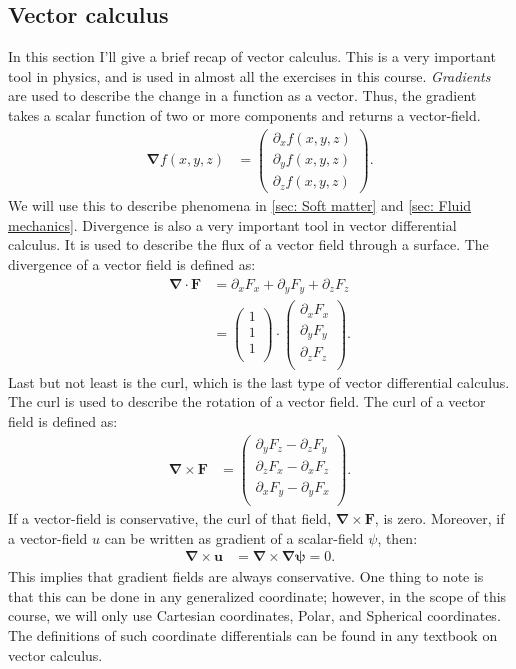 \documentclass[a4paper]{article}
\newcommand{\curl}[1]{\mathbf{\nabla}\times \mathbf{#1}}
\newcommand{\grad}{\mathbf{\nabla}}
\newcommand{\dive}[1]{\mathbf{\nabla}\cdot \mathbf{#1}}
\begin{document}
\subsection{Vector calculus}
In this section I'll give a brief recap of vector calculus. This is a very important tool in physics, and is used in almost all the exercises in this course.
\textit{Gradients} are used to describe the change in a function as a vector. Thus, the gradient takes a scalar function of two or more components and returns a vector-field.
\begin{align*}
    \grad f(x,y,z) &= \begin{pmatrix}\partial_x f(x,y,z)\\\partial_y f(x,y,z)\\\partial_z f(x,y,z)\end{pmatrix}.
\end{align*}We will use this to describe phenomena in \ref{sec: Soft matter} and \ref{sec: Fluid mechanics}. Divergence is also a very important tool in vector differential calculus.
It is used to describe the flux of a vector field through a surface. The divergence of a vector field is defined as:
\begin{align*}
    \dive{F} &= \partial_x F_x + \partial_y F_y + \partial_z F_z\\
    &= \begin{pmatrix}
        1\\
        1\\
        1\\
    \end{pmatrix}\cdot \begin{pmatrix}
        \partial_x F_x\\
        \partial_y F_y\\
        \partial_z F_z\\
    \end{pmatrix}.
\end{align*}Last but not least is the curl, which is the last type of vector differential calculus. The curl is used to describe the rotation of a vector field. The curl of a vector field is defined as:
\begin{align*}
    \curl{F} &= \begin{pmatrix}
        \partial_y F_z - \partial_z F_y\\
        \partial_z F_x - \partial_x F_z\\
        \partial_x F_y - \partial_y F_x\\
    \end{pmatrix}.
\end{align*}If a vector-field is conservative, the curl of that field, $\curl{F}$, is zero. Moreover, if a vector-field $u$ can be written as gradient of a scalar-field $\psi$, then:
\begin{align*}
    \curl{u} &= \curl{\grad \psi} = 0.
\end{align*}This implies that gradient fields are always conservative.
One thing to note is that this can be done in any generalized coordinate; however, in the scope of this course, we will only use Cartesian coordinates, Polar, and Spherical coordinates.
The definitions of such coordinate differentials can be found in any textbook on vector calculus.
\end{document}
